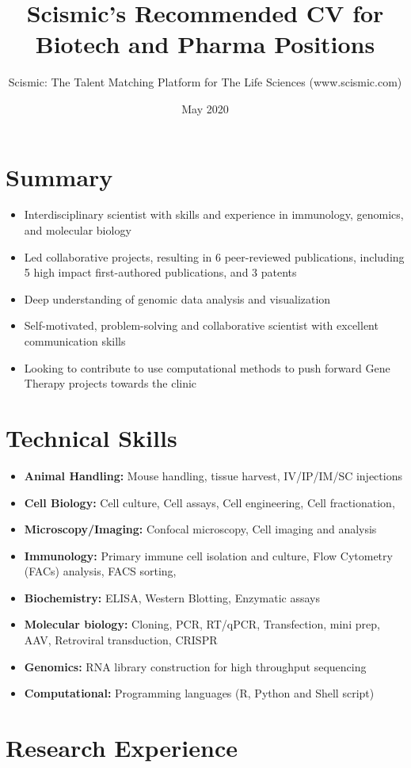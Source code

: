 \documentclass{article}
\title{Scismic's Recommended CV for Biotech and Pharma Positions}
\author{Scismic: The Talent Matching Platform for The Life Sciences (www.scismic.com)}
\date{May 2020}
\begin{document}
\section{Summary}
\begin{itemize}
\item Interdisciplinary scientist with skills and experience in immunology, genomics, and molecular biology 
\item Led collaborative projects, resulting in 6 peer-reviewed publications, including 5 high impact first-authored publications, and 3 patents
\item Deep understanding of genomic data analysis and visualization 
\item Self-motivated, problem-solving and collaborative scientist with excellent communication skills
\item Looking to contribute to use computational methods to push forward Gene Therapy projects towards the clinic
\end{itemize}
 
\section{Technical Skills}

\begin{itemize}
\item \textbf{Animal Handling:} Mouse handling, tissue harvest, IV/IP/IM/SC injections
\item \textbf{Cell Biology:} Cell culture, Cell assays, Cell engineering, Cell fractionation, 
\item \textbf{Microscopy/Imaging:} Confocal microscopy, Cell imaging and analysis 
\item \textbf{Immunology:} Primary immune cell isolation and culture, Flow Cytometry (FACs) analysis, FACS sorting, 
\item \textbf{Biochemistry:} ELISA, Western Blotting, Enzymatic assays
\item \textbf{Molecular biology:} Cloning, PCR, RT/qPCR, Transfection, mini prep, AAV, Retroviral transduction, CRISPR 
\item \textbf{Genomics:} RNA library construction for high throughput sequencing 
\item \textbf{Computational:} Programming languages (R, Python and Shell script)
\end{itemize}
 
\section{Research Experience}
\end{document}
